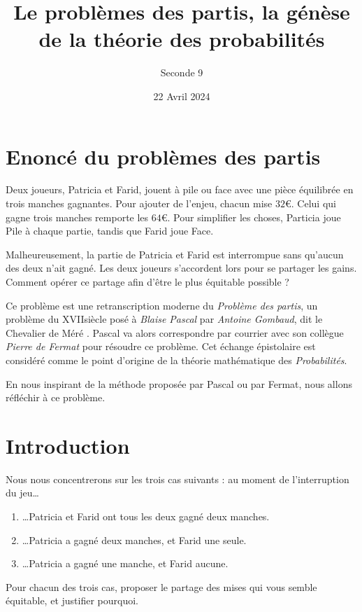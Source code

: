 \documentclass{article}
\title{Le problèmes des partis, la génèse de la théorie des probabilités}
\date{22 Avril 2024}
\author{Seconde 9}
\begin{document}
\maketitle
\thispagestyle{fancy}
\fancyhead[r]{}
\fancyfoot{}
\section{Enoncé du problèmes des partis}
\begin{tcolorbox}
Deux joueurs, Patricia et Farid, jouent à pile ou face avec une pièce équilibrée en trois manches gagnantes. Pour ajouter de l'enjeu, chacun mise $32 €$. Celui qui gagne trois manches remporte les $64 €$. Pour simplifier les choses, Particia joue Pile à chaque partie, tandis que Farid joue Face.  

Malheureusement, la partie de Patricia et Farid est interrompue sans qu'aucun des deux n'ait gagné. Les deux joueurs s'accordent lors pour se partager les gains. Comment opérer ce partage afin d'être le plus équitable possible ?
\end{tcolorbox}

Ce problème est une retranscription moderne du \emph{Problème des partis}, un problème du \textsc{XVII}\ieme siècle posé à \emph{Blaise Pascal} par \emph{Antoine Gombaud}, dit \og le Chevalier de Méré \fg. Pascal va alors correspondre par courrier avec son collègue \emph{Pierre de Fermat} pour résoudre ce problème. Cet échange épistolaire est considéré comme le point d'origine de la théorie mathématique des \emph{Probabilités}.

En nous inspirant de la méthode proposée par Pascal ou par Fermat, nous allons réfléchir à ce problème.

\section{Introduction}
Nous nous concentrerons sur les trois cas suivants : au moment de l'interruption du jeu\dots
\begin{enumerate}
\item \dots Patricia et Farid ont tous les deux gagné deux manches.\label{22}
\item \dots Patricia a gagné deux manches, et Farid une seule.\label{21}
\item \dots Patricia a gagné une manche, et Farid aucune.\label{20}
\end{enumerate}
\begin{tcolorbox}
Pour chacun des trois cas, proposer le partage des mises qui vous semble équitable, et justifier pourquoi.
\end{tcolorbox}
\end{document}
